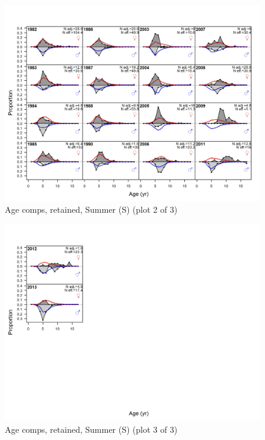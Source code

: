 \documentclass[12pt,]{article}
\begin{document}
\begin{figure}
\centering
\includegraphics{r4ss/plots_mod1/comp_agefit_flt4mkt2_page2.png}
\caption{Age comps, retained, Summer (S) (plot 2 of 3)
\label{fig:age_fits}}
\end{figure}

\begin{figure}
\centering
\includegraphics{r4ss/plots_mod1/comp_agefit_flt4mkt2_page3.png}
\caption{Age comps, retained, Summer (S) (plot 3 of 3)
\label{fig:age_fits}}
\end{figure}

\FloatBarrier

\newpage
\end{document}

